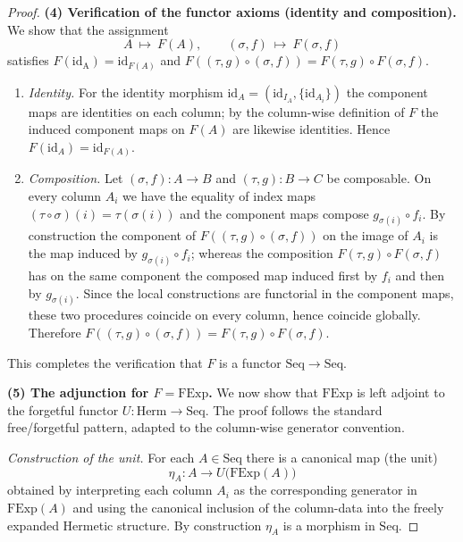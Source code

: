 \documentclass[11pt]{book}
\theoremstyle{definition}
\theoremstyle{plain}
\theoremstyle{remark}
\begin{document}
\begin{proof}
\vspace{6pt}\noindent\textbf{(4) Verification of the functor axioms (identity and composition).}
We show that the assignment
\[
    A\ \mapsto\ F(A),\qquad (\sigma,f)\ \mapsto\ F(\sigma,f)
\]
satisfies \(F(\mathrm{id_A})=\mathrm{id}_{F(A)}\) and
\(F((\tau,g)\circ(\sigma,f))=F(\tau,g)\circ F(\sigma,f)\).

\begin{enumerate}
  \item[\((\mathrm{i})\)] \emph{Identity.} For the identity morphism
    \(\mathrm{id}_A=(\mathrm{id}_{I_A},\{\mathrm{id}_{A_i}\})\) the component maps are identities on
    each column; by the column-wise definition of \(F\) the induced component
    maps on \(F(A)\) are likewise identities. Hence \(F(\mathrm{id}_{A})=\mathrm{id}_{F(A)}\).
  \item[\((\mathrm{ii})\)] \emph{Composition.} Let
    \((\sigma,f)\colon A\to B\) and \((\tau,g)\colon B\to C\) be composable.
    On every column \(A_i\) we have the equality of index maps
    \((\tau\circ\sigma)(i)=\tau(\sigma(i))\) and the component maps compose
    \(g_{\sigma(i)}\circ f_i\).  By construction the component of
    \(F((\tau,g)\circ(\sigma,f))\) on the image of \(A_i\) is the map induced
    by \(g_{\sigma(i)}\circ f_i\); whereas the composition
    \(F(\tau,g)\circ F(\sigma,f)\) has on the same component the composed map
    induced first by \(f_i\) and then by \(g_{\sigma(i)}\).  Since the local
    constructions are functorial in the component maps, these two procedures
    coincide on every column, hence coincide globally.  Therefore
    \(F((\tau,g)\circ(\sigma,f))=F(\tau,g)\circ F(\sigma,f)\).
\end{enumerate}
This completes the verification that \(F\) is a functor \(\mathrm{Seq}\to\mathrm{Seq}\).

\vspace{6pt}\noindent\textbf{(5) The adjunction for \(F=\mathrm{FExp}\).}
We now show that \(\mathrm{FExp}\) is left adjoint to the forgetful functor
\(U:\mathrm{Herm}\to\mathrm{Seq}\). The proof follows the standard free/forgetful pattern,
adapted to the column-wise generator convention.

\medskip\noindent\emph{Construction of the unit.} For each \(A\in\mathrm{Seq}\) there
is a canonical map (the unit)
\[
    \eta_A\colon A \longrightarrow U\big(\mathrm{FExp}(A)\big)
\]
obtained by interpreting each column \(A_i\) as the corresponding generator
in \(\mathrm{FExp}(A)\) and using the canonical inclusion of the column-data
into the freely expanded Hermetic structure.  By construction \(\eta_A\) is a
morphism in \(\mathrm{Seq}\).


\end{proof}
\end{document}
